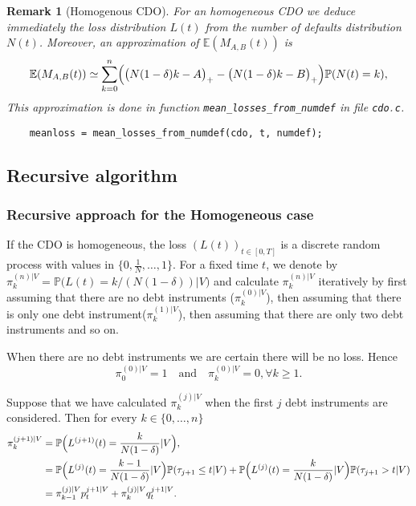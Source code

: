 \documentclass[10pt, a4paper]{article}
\newcommand{\code}[1]{{\upshape \lstinline[language=c]{#1}}}
\newcommand{\E}{\mathbb{E}}
\renewcommand{\P}{\mathbb{P}}
\newtheorem{rmk}{Remark}
\begin{document}
\begin{rmk}[Homogenous CDO]
For an homogeneous CDO we deduce immediately the loss distribution $L(t)$ from the number of defaults distribution $N(t)$. Moreover, an approximation of $\E(M_{A,B}(t))$ is  
\begin{equation*}
    \E(M_{A,B}(t)) \simeq \sum_{k=0}^n \Bigl( \bigl( N(1-\delta) k - A \bigr)_+ - \bigl( N(1-\delta) k - B \bigr)_+ \Bigr) \P(N(t) = k),
\end{equation*}
This approximation is done in function \code{mean_losses_from_numdef} in file \code{cdo.c}. 
{\upshape \begin{lstlisting}
    meanloss = mean_losses_from_numdef(cdo, t, numdef);
\end{lstlisting}}
\end{rmk}

\subsection{Recursive algorithm}
\subsubsection*{Recursive approach for the Homogeneous case}
If the CDO is homogeneous, the loss $(L(t))_{t \in [0,T]}$ is a discrete random process with values in $\{0, \frac{1}{N}, \dots, 1\}$. For a fixed time $t$, we denote by $\pi^{(n)|V}_k = \P \bigl(L(t) = k/(N(1-\delta)) | V\bigr)$ and calculate $\pi^{(n)|V}_k$ iteratively by first assuming that there are no debt instruments ($\pi^{(0)|V}_k$), then assuming that there is only one debt instrument($\pi^{(1)|V}_k$), then assuming that there are only two debt instruments and so on. 

When there are no debt instruments we are certain there will be no loss. Hence 
\begin{equation*}
    \pi^{(0)|V}_0 = 1 \quad \text{and} \quad \pi^{(0)|V}_k = 0, \forall k \ge 1.
\end{equation*}

Suppose that we have calculated $\pi^{(j)|V}_k$ when the first $j$ debt instruments are considered. Then for every $k \in \{0, \dots, n\}$  
\begin{align*}
    \pi^{(j+1)|V}_k &= \P\Bigl(L^{(j+1)}(t) = \frac{k}{N(1-\delta)} | V\Bigr), \\
    &= \P\Bigl(L^{(j)}(t) = \frac{k-1}{N(1-\delta)} | V\Bigr) \P(\tau_{j+1} \le t | V) + 
    \P\Bigl(L^{(j)}(t) = \frac{k}{N(1-\delta)} | V\Bigr) \P(\tau_{j+1} > t | V) \\
    &= \pi^{(j)|V}_{k-1} p_t^{j+1|V} + \pi^{(j)|V}_k q_t^{j+1|V}.
\end{align*}
\end{document}
